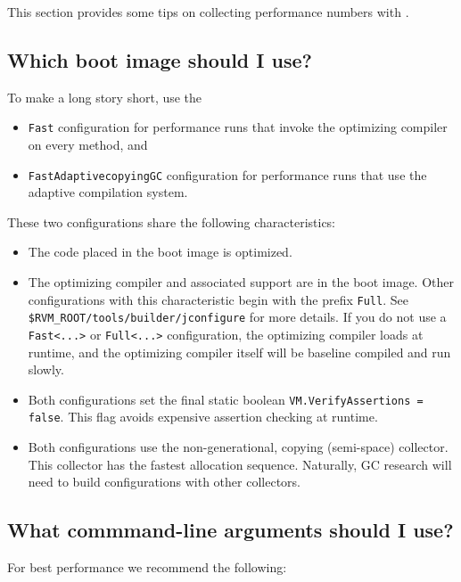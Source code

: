 This section provides some tips on collecting performance numbers with
\jp.

\subsection{Which boot image should I use?}

To make a long story short, use the
\begin{itemize}
\item {\tt Fast} configuration for performance runs that invoke the optimizing compiler on every method, and
\item {\tt FastAdaptivecopyingGC} configuration for performance runs that use the adaptive compilation system.
\end{itemize}

These two configurations share the following characteristics:

\begin{itemize}
\item The code placed in the boot image is optimized.
\item The optimizing compiler and associated support are in
the boot image.  Other
configurations with this characteristic begin with the prefix {\tt Full}.
See {\tt \$RVM\_ROOT/tools/builder/jconfigure} for more details.
If you do not use a {\tt Fast<...>} or {\tt Full<...>} configuration, 
the optimizing
compiler loads at runtime, and the optimizing compiler itself will be
baseline compiled and run slowly.
\item Both configurations set the final static boolean
{\tt VM.VerifyAssertions = false}.  This flag avoids expensive assertion
checking at runtime.
\item Both configurations use the non-generational, copying (semi-space) 
collector.  This collector has the fastest allocation sequence.  
Naturally, GC research will need to build configurations with other
collectors.
\end{itemize}

\subsection{What commmand-line arguments should I use?}

For best performance we recommend the following:


